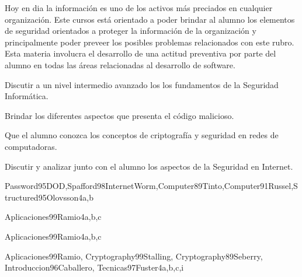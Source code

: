 \begin{syllabus}


\begin{justification}
Hoy en dia la información es uno de los activos más preciados en cualquier organización. 
Este cursos está orientado a poder brindar al alumno los elementos de seguridad orientados a proteger la 
información de la organización y principalmente poder preveer los posibles problemas relacionados con este rubro. 
Esta materia involucra el desarrollo de una actitud preventiva por parte del alumno en todas las áreas 
relacionadas al desarrollo de software.
\end{justification}

\begin{goals}
\item Discutir a un nivel intermedio avanzado los los fundamentos de la Seguridad Informática.
\item Brindar los diferentes aspectos que presenta el código malicioso.
\item Que el alumno conozca los conceptos de criptografía y seguridad en redes de computadoras.
\item Discutir y analizar junto con el alumno los aspectos de la Seguridad en Internet.
\end{goals}

\begin{unit}{\PFFoundationsInformationSecurityDef}{}{Password95DOD,Spafford98InternetWorm,Computer89Tinto,Computer91Russel,Structured95Olovsson}{4}{a,b}
    \PFFoundationsInformationSecurityAllTopics
    \PFFoundationsInformationSecurityAllObjectives
\end{unit}

\begin{unit}{\PFSecureProgrammingDef}{}{Aplicaciones99Ramio}{4}{a,b,c}
    \PFSecureProgrammingAllTopics
    \PFSecureProgrammingAllObjectives
\end{unit}

\begin{unit}{\OSSecurityModelsDef}{}{Aplicaciones99Ramio}{4}{a,b,c}
    \OSSecurityModelsAllTopics
    \OSSecurityModelsAllObjectives
\end{unit}

\begin{unit}{\ALCryptographicAlgorithmsDef}{}{Aplicaciones99Ramio, Cryptography99Stalling, Cryptography89Seberry, Introduccion96Caballero, Tecnicas97Fuster}{4}{a,b,c,i}
    \ALCryptographicAlgorithmsAllTopics
    \ALCryptographicAlgorithmsAllObjectives
\end{unit}


\end{syllabus}
